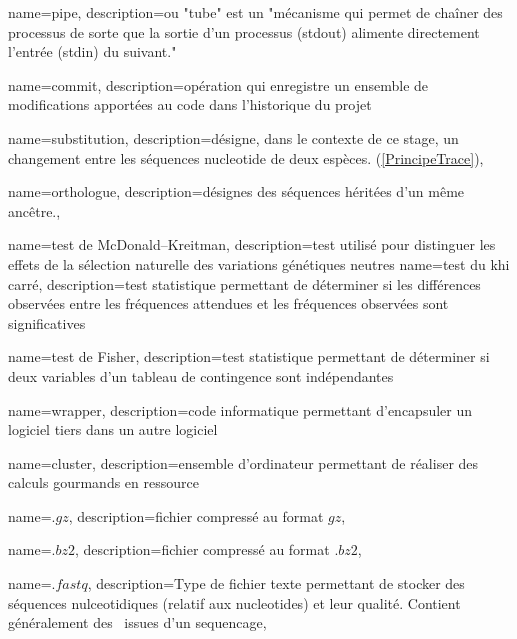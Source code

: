  {
    name=pipe,
    description={ou "tube" est un "mécanisme qui permet de chaîner des processus de sorte que la sortie d'un processus (stdout) alimente directement l'entrée (stdin) du suivant." \cite{LeDico}}
}
\newcommand{\pipe}{\gls{pipe}}

 {
    name=commit,
    description={opération qui enregistre un ensemble de modifications apportées au code dans l'historique du projet}
}


 {
    name=substitution,
    description={désigne, dans le contexte de ce stage, un changement entre les séquences nucleotide de deux espèces. (\cref{PrincipeTrace})},
}

 {
    name=orthologue,
    description={désignes des séquences héritées d'un même ancêtre.},
}

 {
    name=test de McDonald–Kreitman,
    description={test utilisé pour distinguer les effets de la sélection naturelle des variations génétiques neutres}
}
 {
    name=test du khi carré,
    description={test statistique permettant de déterminer si les différences observées entre les fréquences attendues et les fréquences observées sont significatives}
}

 {
    name=test de Fisher,
    description={test statistique permettant de déterminer si deux variables d'un tableau de contingence sont indépendantes}
}

 {
    name=wrapper,
    description={code informatique permettant d'encapsuler un logiciel tiers dans un autre logiciel}
}

 {
    name=cluster,
    description={ensemble d'ordinateur permettant de réaliser des calculs gourmands en ressource}
}

 {
    name=$.gz$,
    description={fichier compressé au format $gz$},
}
\newcommand{\gz}{"\gls{gz}"}

 {
    name=$.bz2$,
    description={fichier compressé au format $.bz2$},
}
\newcommand{\bz}{"\gls{bz}"}


 {
    name=$.fastq$,
    description={Type de fichier texte permettant de stocker des séquences nulceotidiques (relatif aux \glspl{nucleotide}) et leur qualité. Contient généralement des \reads issues d'un \gls{sequencage}},
}
\newcommand{\fastq}{"\gls{fastq}"}


